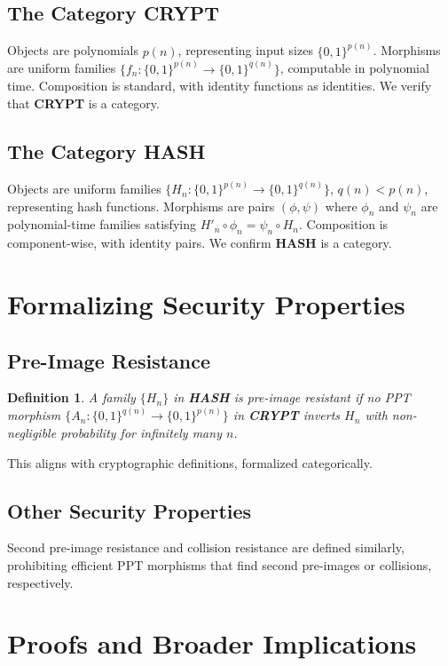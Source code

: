 \documentclass{article}
\theoremstyle{plain}
\newtheorem{definition}{Definition}
\begin{document}
\subsection{The Category \textbf{CRYPT}}
Objects are polynomials \( p(n) \), representing input sizes \( \{0,1\}^{p(n)} \). Morphisms are uniform families \( \{ f_n : \{0,1\}^{p(n)} \to \{0,1\}^{q(n)} \} \), computable in polynomial time. Composition is standard, with identity functions as identities. We verify that \textbf{CRYPT} is a category.

\subsection{The Category \textbf{HASH}}
Objects are uniform families \( \{ H_n : \{0,1\}^{p(n)} \to \{0,1\}^{q(n)} \} \), \( q(n) < p(n) \), representing hash functions. Morphisms are pairs \( (\phi, \psi) \) where \( \phi_n \) and \( \psi_n \) are polynomial-time families satisfying \( H'_n \circ \phi_n = \psi_n \circ H_n \). Composition is component-wise, with identity pairs. We confirm \textbf{HASH} is a category.

\section{Formalizing Security Properties}
\subsection{Pre-Image Resistance}
\begin{definition}
A family \( \{ H_n \} \) in \textbf{HASH} is pre-image resistant if no PPT morphism \( \{ A_n : \{0,1\}^{q(n)} \to \{0,1\}^{p(n)} \} \) in \textbf{CRYPT} inverts \( H_n \) with non-negligible probability for infinitely many \( n \).
\end{definition}
This aligns with cryptographic definitions, formalized categorically.

\subsection{Other Security Properties}
Second pre-image resistance and collision resistance are defined similarly, prohibiting efficient PPT morphisms that find second pre-images or collisions, respectively.

\section{Proofs and Broader Implications}
\end{document}
